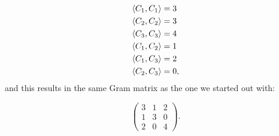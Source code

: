 \documentclass[12pt]{report}
\theoremstyle{definition}
\DeclarePairedDelimiter\iprod{\langle}{\rangle}
\theoremstyle{upright}
\begin{document}
\[\begin{aligned}
    \iprod*{C_1, C_1}&=3\\
    \iprod*{C_2, C_2}&=3\\
    \iprod*{C_3, C_3}&=4\\
    \iprod*{C_1, C_2}&=1\\
    \iprod*{C_1, C_3}&=2\\
    \iprod*{C_2, C_3}&=0,
\end{aligned}\]
and this results in the same Gram matrix as the one we started out with:

\[\begin{pmatrix}
    3 & 1 & 2\\
    1 & 3 & 0\\
    2 & 0 & 4
\end{pmatrix}.\]

\newpage

\printbibliography[title=References]
\end{document}
